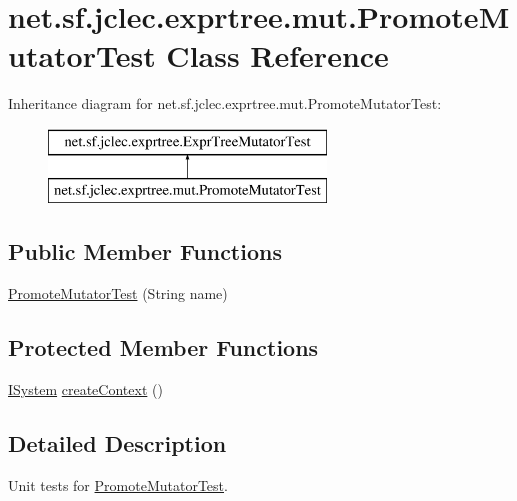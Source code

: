 \hypertarget{classnet_1_1sf_1_1jclec_1_1exprtree_1_1mut_1_1_promote_mutator_test}{\section{net.\-sf.\-jclec.\-exprtree.\-mut.\-Promote\-Mutator\-Test Class Reference}
\label{classnet_1_1sf_1_1jclec_1_1exprtree_1_1mut_1_1_promote_mutator_test}
}
Inheritance diagram for net.\-sf.\-jclec.\-exprtree.\-mut.\-Promote\-Mutator\-Test\-:\begin{figure}[H]
\begin{center}
\leavevmode
\includegraphics[height=2.000000cm]{classnet_1_1sf_1_1jclec_1_1exprtree_1_1mut_1_1_promote_mutator_test}
\end{center}
\end{figure}
\subsection*{Public Member Functions}
\begin{DoxyCompactItemize}
\item 
\hyperlink{classnet_1_1sf_1_1jclec_1_1exprtree_1_1mut_1_1_promote_mutator_test_a3ef4ed40fdaa6bb5f02dc5c1479f5fce}{Promote\-Mutator\-Test} (String name)
\end{DoxyCompactItemize}
\subsection*{Protected Member Functions}
\begin{DoxyCompactItemize}
\item 
\hyperlink{interfacenet_1_1sf_1_1jclec_1_1_i_system}{I\-System} \hyperlink{classnet_1_1sf_1_1jclec_1_1exprtree_1_1mut_1_1_promote_mutator_test_af8498f45fc22ebc96c7e82f546e37b07}{create\-Context} ()
\end{DoxyCompactItemize}


\subsection{Detailed Description}
Unit tests for \hyperlink{classnet_1_1sf_1_1jclec_1_1exprtree_1_1mut_1_1_promote_mutator_test}{Promote\-Mutator\-Test}.

